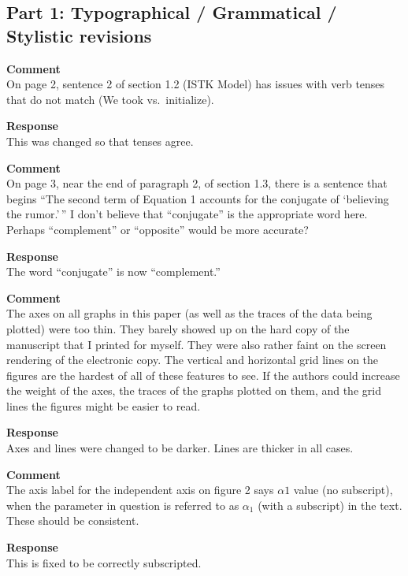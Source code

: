 \subsection{Part 1: Typographical / Grammatical / Stylistic revisions}
\setcounter{rev1-part1}{1}

\textbf{Comment } \\
On page 2, sentence 2 of section 1.2 (ISTK Model) has issues with verb tenses that do not match (We took vs.\ initialize).

\textbf{Response } \\
This was changed so that tenses agree.

\textbf{Comment } \\
On page 3, near the end of paragraph 2, of section 1.3, there is a sentence that begins ``The second term of Equation 1 accounts for the conjugate of `believing the rumor.'\,''  I don't believe that ``conjugate'' is the appropriate word here.  Perhaps ``complement'' or ``opposite'' would be more accurate?

\textbf{Response } \\
The word ``conjugate'' is now ``complement.''

\textbf{Comment } \\
The axes on all graphs in this paper (as well as the traces of the data being plotted) were too thin.
They barely showed up on the hard copy of the manuscript that I printed for myself.
They were also rather faint on the screen rendering of the electronic copy.
The vertical and horizontal grid lines on the figures are the hardest of all of these features to see.
If the authors could increase the weight of the axes, the traces of the graphs plotted on them, and the grid lines the figures might be easier to read.

\textbf{Response } \\
Axes and lines were changed to be darker. Lines are thicker in all cases.

\textbf{Comment } \\
The axis label for the independent axis on figure 2 says $ \alpha 1 $ value (no subscript), when the parameter in question is referred to as $ \alpha_1 $ (with a subscript) in the text.
These should be consistent.

\textbf{Response } \\
This is fixed to be correctly subscripted.
